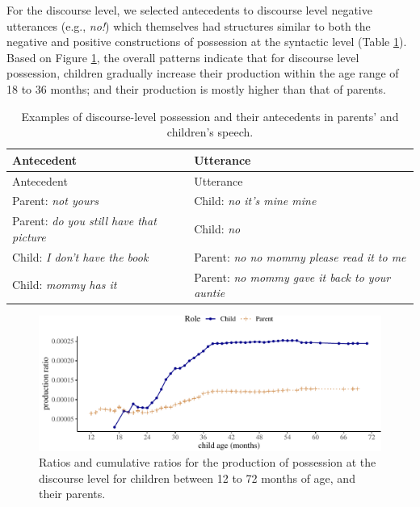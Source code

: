 \documentclass[
  english,
  man,floatsintext]{apa6}
\begin{document}
For the discourse level, we selected antecedents to discourse level negative utterances (e.g., \emph{no!}) which themselves had structures similar to both the negative and positive constructions of possession at the syntactic level (Table \ref{tab:dispossess}). Based on Figure \ref{fig:possessiondiscourse}, the overall patterns indicate that for discourse level possession, children gradually increase their production within the age range of 18 to 36 months; and their production is mostly higher than that of parents.

\begin{longtable}[]{@{}ll@{}}
\caption{\label{tab:dispossess} Examples of discourse-level possession and their antecedents in parents' and children's speech.}\tabularnewline
\toprule
Antecedent & Utterance \\
\midrule
\endfirsthead
\toprule
Antecedent & Utterance \\
\midrule
\endhead
Parent: \emph{not yours} & Child: \emph{no it's mine mine} \\
Parent: \emph{do you still have that picture} & Child: \emph{no} \\
Child: \emph{I don't have the book} & Parent: \emph{no no mommy please read it to me} \\
Child: \emph{mommy has it} & Parent: \emph{no mommy gave it back to your auntie} \\
\bottomrule
\end{longtable}

\begin{figure}[H]

{\centering \includegraphics{neg_construction_article_files/figure-latex/possessiondiscourse-1} 

}

\caption{Ratios and cumulative ratios for the production of possession at the discourse level for children between 12 to 72 months of age, and their parents.}\label{fig:possessiondiscourse}
\end{figure}
\end{document}
